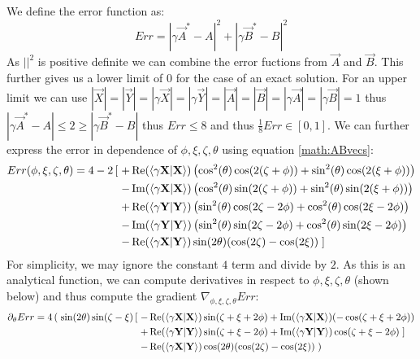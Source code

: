 \documentclass[Master]{subfiles}
\begin{document}
We define the error function as:
$$ Err= |\gamma \vec{A}^*-A|^2 + |\gamma \vec{B}^*-B|^2 $$
As $||^2$ is positive definite we can combine the error fuctions from $\vec{A}$ and $\vec{B}$. This further gives us a lower limit of $0$ for the case of an exact solution. For an upper limit we can use $|\vec{X}|=|\vec{Y}|=|\gamma\vec{X}|=|\gamma\vec{Y}|=|\vec{A}|=|\vec{B}|=|\gamma\vec{A}|=|\gamma\vec{B}|= 1$ thus $|\gamma \vec{A}^*-A| \leq 2 \geq |\gamma \vec{B}^*-B|$ thus $Err \leq 8$ and thus $\frac{1}{8}Err \in  [0,1]$.
We can further express the error in dependence of $ \phi , \xi, \zeta , \theta $ using equation \eqref{math:ABvecs}:
\begin{equation}
\begin{split}Err(\phi,\xi,\zeta,\theta) = 4 - 2\left[ \right.
+ &\Re(\braket{\gamma\mathbf{X}}{\mathbf{X}}) \left(\cos ^2(\theta ) \cos (2 (\zeta +\phi ))+\sin ^2(\theta ) \cos (2 (\xi +\phi ))\right)\\
- &\Im(\braket{\gamma\mathbf{X}}{\mathbf{X}}) \left(\cos ^2(\theta ) \sin (2 (\zeta +\phi ))+\sin ^2(\theta ) \sin (2 (\xi +\phi ))\right)\\
+ &\Re(\braket{\gamma\mathbf{Y}}{\mathbf{Y}}) \left(\sin ^2(\theta ) \cos (2 \zeta -2 \phi )+\cos ^2(\theta ) \cos (2 \xi -2 \phi )\right)\\
- &\Im(\braket{\gamma\mathbf{Y}}{\mathbf{Y}}) \left(\sin ^2(\theta ) \sin (2 \zeta -2 \phi )+\cos ^2(\theta ) \sin (2 \xi -2 \phi )\right)\\
- &\Re(\braket{\gamma\mathbf{X}}{\mathbf{Y}}) \sin (2 \theta ) (\cos (2 \zeta )-\cos (2 \xi )) 
\left. \right]\end{split} 
\end{equation}
For simplicity, we may ignore the constant $4$ term and divide by $2$.
As this is an analytical function, we can compute derivatives in respect to $\phi,\xi,\zeta,\theta$ (shown below) and thus compute the gradient 
$\nabla_{\phi,\xi,\zeta,\theta} Err$:
\begin{equation}\label{math:ABvecsD1}
\begin{split}
\partial_\theta Err =
4 \left(\right. \sin (2 \theta ) \sin (\zeta -\xi )
\left[ \right.
- &\Re(\braket{\gamma\mathbf{X}}{\mathbf{X}}) \sin (\zeta +\xi +2 \phi )
+  \Im(\braket{\gamma\mathbf{X}}{\mathbf{X}}) (-\cos (\zeta +\xi +2 \phi ))\\
+ &\Re(\braket{\gamma\mathbf{Y}}{\mathbf{Y}}) \sin (\zeta +\xi -2 \phi )
+  \Im(\braket{\gamma\mathbf{Y}}{\mathbf{Y}}) \cos (\zeta +\xi -2 \phi )\left.\right]\\
- &\Re(\braket{\gamma\mathbf{X}}{\mathbf{Y}}) \cos (2 \theta ) (\cos (2 \zeta )-\cos (2 \xi )) \left.\right)
\end{split}
\end{equation}
\end{document}
